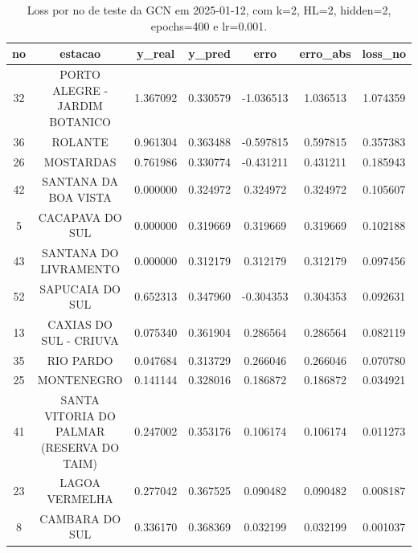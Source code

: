 \begin{table}[h]
\centering
\caption{Loss por no de teste da GCN em 2025-01-12, com k=2, HL=2, hidden=2, epochs=400 e lr=0.001.}
\label{tab:gcn_loss_k2_hl2_h2_e400_d20250112}
\begin{tabular}{ccccccc}
\toprule
no & estacao & y\_real & y\_pred & erro & erro\_abs & loss\_no \\
\midrule
32 & PORTO ALEGRE - JARDIM BOTANICO & 1.367092 & 0.330579 & -1.036513 & 1.036513 & 1.074359 \\
36 & ROLANTE & 0.961304 & 0.363488 & -0.597815 & 0.597815 & 0.357383 \\
26 & MOSTARDAS & 0.761986 & 0.330774 & -0.431211 & 0.431211 & 0.185943 \\
42 & SANTANA DA BOA VISTA & 0.000000 & 0.324972 & 0.324972 & 0.324972 & 0.105607 \\
5 & CACAPAVA DO SUL & 0.000000 & 0.319669 & 0.319669 & 0.319669 & 0.102188 \\
43 & SANTANA DO LIVRAMENTO & 0.000000 & 0.312179 & 0.312179 & 0.312179 & 0.097456 \\
52 & SAPUCAIA DO SUL & 0.652313 & 0.347960 & -0.304353 & 0.304353 & 0.092631 \\
13 & CAXIAS DO SUL - CRIUVA & 0.075340 & 0.361904 & 0.286564 & 0.286564 & 0.082119 \\
35 & RIO PARDO & 0.047684 & 0.313729 & 0.266046 & 0.266046 & 0.070780 \\
25 & MONTENEGRO & 0.141144 & 0.328016 & 0.186872 & 0.186872 & 0.034921 \\
41 & SANTA VITORIA DO PALMAR (RESERVA DO TAIM) & 0.247002 & 0.353176 & 0.106174 & 0.106174 & 0.011273 \\
23 & LAGOA VERMELHA & 0.277042 & 0.367525 & 0.090482 & 0.090482 & 0.008187 \\
8 & CAMBARA DO SUL & 0.336170 & 0.368369 & 0.032199 & 0.032199 & 0.001037 \\
\bottomrule
\end{tabular}
\end{table}
